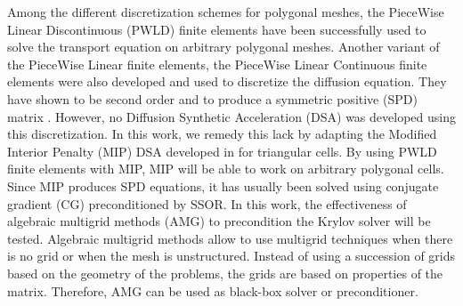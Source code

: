 Among the different discretization schemes for polygonal meshes, the PieceWise 
Linear Discontinuous (PWLD) finite elements \cite{pwld_2d,pwld_3d} 
have been successfully used to solve the transport equation on arbitrary
polygonal meshes. Another variant of the PieceWise Linear finite elements, the
PieceWise Linear Continuous finite elements were also developed and used 
to discretize the diffusion equation. They have shown to be second order and to
produce a symmetric positive (SPD) matrix \cite{pwl_diffusion}. However, no 
Diffusion Synthetic Acceleration (DSA) \cite{dsa_ref,larsen_dsa,consistent_p1} 
was developed using this discretization. In this work, we remedy this lack by 
adapting the Modified Interior Penalty (MIP) DSA developed in \cite{mip} for 
triangular cells. By using PWLD finite elements with MIP, MIP will be able to 
work on arbitrary polygonal cells. Since MIP produces SPD equations, it has usually 
been solved using conjugate gradient (CG) preconditioned by SSOR. In this
work, the effectiveness of algebraic multigrid methods (AMG) to precondition 
the Krylov solver \cite{amg,amg_course} will be tested. Algebraic multigrid methods 
allow to use multigrid techniques when there is no grid or when the mesh is 
unstructured. Instead of using a succession of grids based on the geometry of the 
problems, the grids are based on properties of the matrix. Therefore, AMG can
be used as black-box solver or preconditioner.
